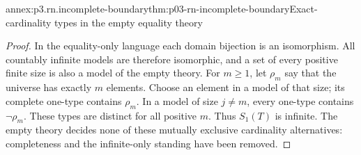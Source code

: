 \begin{annexitem}{annex:p3.rn.incomplete-boundary}{thm:p03-rn-incomplete-boundary}{Exact-cardinality types in the empty equality theory}
\begin{proof}
In the equality-only language each domain bijection is
an isomorphism. All countably infinite models are
therefore isomorphic, and a set of every positive
finite size is also a model of the empty theory.
For \(m\geq1\), let \(\rho_m\) say that the universe
has exactly \(m\) elements. Choose an element in a
model of that size; its complete one-type contains
\(\rho_m\). In a model of size \(j\ne m\), every
one-type contains \(\neg\rho_m\).
These types are distinct for all positive \(m\).
Thus \(S_1(T)\) is infinite.
The empty theory decides none of these mutually
exclusive cardinality alternatives: completeness
and the infinite-only standing have been removed.
\end{proof}
\end{annexitem}

